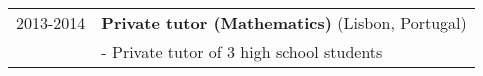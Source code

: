 \documentclass[a4paper,11pt]{article} %
\begin{document}
\begin{tabular}{r|p{13cm}}
	2013-2014 & \textbf{Private tutor (Mathematics)} (Lisbon, Portugal) \\
	& - Private tutor of 3 high school students \\
\end{tabular}


%
%
%
%
%
\end{document}
